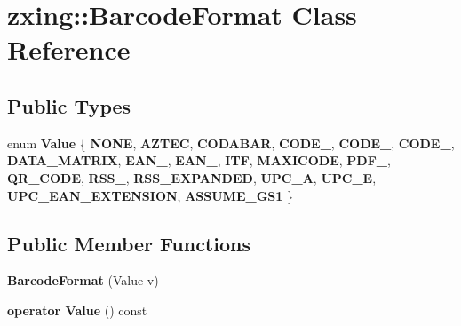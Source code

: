 \hypertarget{classzxing_1_1_barcode_format}{}\section{zxing\+:\+:Barcode\+Format Class Reference}
\label{classzxing_1_1_barcode_format}
\subsection*{Public Types}
\begin{DoxyCompactItemize}
\item 
\mbox{\label{classzxing_1_1_barcode_format_a53cafdcea01164c0a83bf0326c7061a3}} 
enum {\bfseries Value} \{ \newline
{\bfseries N\+O\+NE}, 
{\bfseries A\+Z\+T\+EC}, 
{\bfseries C\+O\+D\+A\+B\+AR}, 
{\bfseries C\+O\+D\+E\+\_}, 
\newline
{\bfseries C\+O\+D\+E\+\_}, 
{\bfseries C\+O\+D\+E\+\_}, 
{\bfseries D\+A\+T\+A\+\_\+\+M\+A\+T\+R\+IX}, 
{\bfseries E\+A\+N\+\_}, 
\newline
{\bfseries E\+A\+N\+\_}, 
{\bfseries I\+TF}, 
{\bfseries M\+A\+X\+I\+C\+O\+DE}, 
{\bfseries P\+D\+F\+\_}, 
\newline
{\bfseries Q\+R\+\_\+\+C\+O\+DE}, 
{\bfseries R\+S\+S\+\_}, 
{\bfseries R\+S\+S\+\_\+\+E\+X\+P\+A\+N\+D\+ED}, 
{\bfseries U\+P\+C\+\_\+A}, 
\newline
{\bfseries U\+P\+C\+\_\+E}, 
{\bfseries U\+P\+C\+\_\+\+E\+A\+N\+\_\+\+E\+X\+T\+E\+N\+S\+I\+ON}, 
{\bfseries A\+S\+S\+U\+M\+E\+\_\+\+G\+S1}
 \}
\end{DoxyCompactItemize}
\subsection*{Public Member Functions}
\begin{DoxyCompactItemize}
\item 
\mbox{\label{classzxing_1_1_barcode_format_aa4c522e94b5d617d59776d0e3bd483f8}} 
{\bfseries Barcode\+Format} (Value v)
\item 
\mbox{\label{classzxing_1_1_barcode_format_a4ea6d23d0d711a8319f4d0f2acf57078}} 
{\bfseries operator Value} () const
\end{DoxyCompactItemize}
